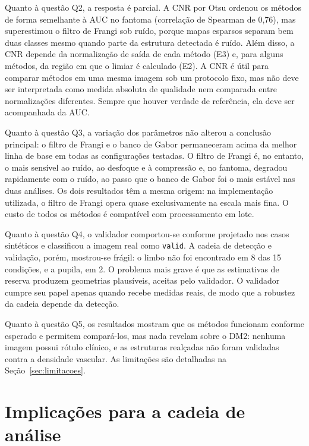 \documentclass[12pt, oneside, a4paper, chapter=TITLE, section=TITLE,
               english, brazil]{abntex2}
\newcommand{\secao}[1]{\section[\texorpdfstring{\protect\MakeTextUppercase{#1}}{#1}]{#1}}
\begin{document}
Quanto à questão Q2, a resposta é parcial. A CNR por Otsu ordenou os métodos
de forma semelhante à AUC no fantoma (correlação de Spearman de 0,76), mas
superestimou o filtro de Frangi sob ruído, porque mapas esparsos separam bem
duas classes mesmo quando parte da estrutura detectada é ruído. Além disso, a
CNR depende da normalização de saída de cada método (E3) e, para alguns
métodos, da região em que o limiar é calculado (E2). A CNR é útil para
comparar métodos em uma mesma imagem sob um protocolo fixo, mas não deve ser
interpretada como medida absoluta de qualidade nem comparada entre
normalizações diferentes. Sempre que houver verdade de referência, ela deve
ser acompanhada da AUC.

Quanto à questão Q3, a variação dos parâmetros não alterou a conclusão
principal: o filtro de Frangi e o banco de Gabor permaneceram acima da melhor
linha de base em todas as configurações testadas. O filtro de Frangi é, no
entanto, o mais sensível ao ruído, ao desfoque e à compressão e, no fantoma,
degradou rapidamente com o ruído, ao passo que o banco de Gabor foi o mais
estável nas duas análises. Os dois resultados têm a mesma origem: na
implementação utilizada, o filtro de Frangi opera quase exclusivamente na
escala mais fina. O custo de todos os métodos é compatível com processamento
em lote.

Quanto à questão Q4, o validador comportou-se conforme projetado nos casos
sintéticos e classificou a imagem real como \texttt{valid}. A cadeia de
detecção e validação, porém, mostrou-se frágil: o limbo não foi encontrado em
8 das 15 condições, e a pupila, em 2. O problema mais grave é que as
estimativas de reserva produzem geometrias plausíveis, aceitas pelo
validador. O validador cumpre seu papel apenas quando recebe medidas reais, de
modo que a robustez da cadeia depende da detecção.

Quanto à questão Q5, os resultados mostram que os métodos funcionam conforme
esperado e permitem compará-los, mas nada revelam sobre o DM2: nenhuma imagem
possui rótulo clínico, e as estruturas realçadas não foram validadas contra a
densidade vascular. As limitações são detalhadas na
Seção~\ref{sec:limitacoes}.

\secao{Implicações para a cadeia de análise}
\end{document}
